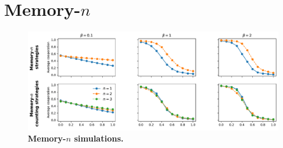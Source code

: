 \documentclass[11pt]{article}
\theoremstyle{plainCl1}
\theoremstyle{plainCl2}
\begin{document}
\newpage

\section{Memory-$n$}

\begin{figure}[t]
  \centering
  \includegraphics[width=\textwidth]{../../figures/siFigMemorySim.pdf}
  \caption{
  \textbf{Memory-$n$ simulations.}}
\end{figure}
\end{document}
